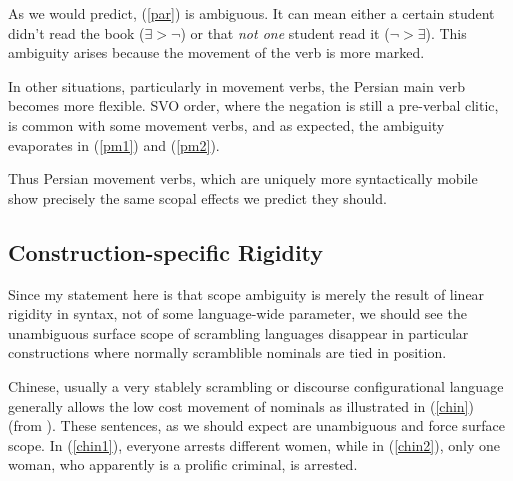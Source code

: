 \documentclass{article}
\begin{document}
\begin{exe}
\end{exe}

As we would predict, (\ref{par}) is ambiguous. It can mean either a certain student didn't read the book ($\exists > \neg$) or that \emph{not one} student read it ($\neg > \exists$). This ambiguity arises because the movement of the verb is more marked.

In other situations, particularly in movement verbs, the Persian main verb becomes more flexible. SVO order, where the negation is still a pre-verbal clitic, is common with some movement verbs, and as expected, the ambiguity evaporates in (\ref{pm1}) and (\ref{pm2}).

\begin{exe}
\end{exe}

Thus Persian movement verbs, which are uniquely more syntactically mobile show precisely the same scopal effects we predict they should.

\subsection{Construction-specific Rigidity}

Since my statement here is that scope ambiguity is merely the result of linear rigidity in syntax, not of some language-wide parameter, we should see the unambiguous surface scope of scrambling languages disappear in particular constructions where normally scramblible nominals are tied in position.

Chinese, usually a very stablely scrambling or discourse configurational language generally allows the low cost movement of nominals as illustrated in (\ref{chin}) (from \textcite{aoun93}). These sentences, as we should expect are unambiguous and force surface scope. In (\ref{chin1}), everyone arrests different women, while in (\ref{chin2}), only one woman, who apparently is a prolific criminal, is arrested.
\end{document}
